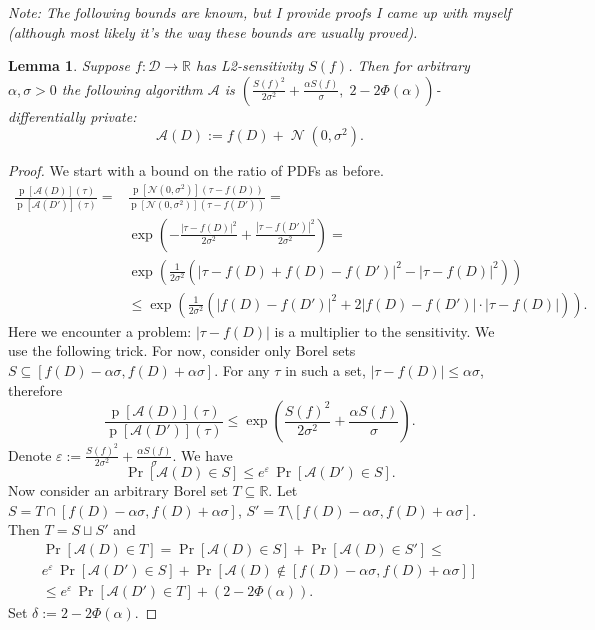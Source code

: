 \documentclass[12pt,letterpaper]{article}
\newcommand{\R}{\mathbb{R}}
\let\eps\varepsilon
\newcommand{\p}{\operatorname{p}}
\newtheorem{lemma}{Lemma}
\newcommand{\No}{\mathcal{N}}
\begin{document}
{\it Note: The following bounds are known, but I provide proofs I came up with myself (although most likely it's the way these bounds are usually proved).}
\begin{lemma}
  \label{lm:gaussian}
Suppose $f: \mathcal{D} \to \R$ has L2-sensitivity $S(f)$. Then for arbitrary $\alpha, \sigma > 0$ the following algorithm $\mathcal{A}$ is $\left(\tfrac{S(f)^2}{2\sigma^2} + \tfrac{\alpha S(f)}{\sigma},\; 2 - 2\Phi(\alpha)\right)$-differentially private:
$$\mathcal{A}(D) := f(D) + \operatorname{\No}(0, \sigma^2).$$
\end{lemma}
\begin{proof}
  We start with a bound on the ratio of PDFs as before.
  \begin{align*}
    \frac{\p[\mathcal{A}(D)](\tau)}{\p[\mathcal{A}(D')](\tau)} = &
    \frac{\p[\No(0, \sigma^2)](\tau - f(D))}{\p[\No(0,\sigma^2)](\tau - f(D'))} = \\
    &\exp\left(-\frac{|\tau - f(D)|^2}{2\sigma^2} + \frac{|\tau - f(D')|^2}{2\sigma^2}\right) = \\
    &\exp\left(\frac{1}{2\sigma^2}\left(|\tau - f(D) + f(D) - f(D')|^2 - |\tau - f(D)|^2\right)\right) \\
    &\leq \exp\left(\frac{1}{2\sigma^2}\left(|f(D) - f(D')|^2 + 2|f(D) - f(D')|\cdot|\tau - f(D)|\right)\right).
\end{align*}
Here we encounter a problem: $|\tau - f(D)|$ is a multiplier to the sensitivity. We use the following trick.
For now, consider only Borel sets $S \subseteq [f(D) - \alpha\sigma, f(D) + \alpha\sigma]$.
For any $\tau$ in such a set, $|\tau - f(D)| \leq \alpha\sigma$, therefore 
$$\frac{\p[\mathcal{A}(D)](\tau)}{\p[\mathcal{A}(D')](\tau)} \leq \exp\!\left(\frac{S(f)^2}{2\sigma^2} + \frac{\alpha S(f)}{\sigma}\right).$$
Denote $\eps := \tfrac{S(f)^2}{2\sigma^2} + \tfrac{\alpha S(f)}{\sigma}$. We have
$$\Pr[\mathcal{A}(D) \in S] \leq e^{\eps} \, \Pr[\mathcal{A}(D') \in S].$$
Now consider an arbitrary Borel set $T \subseteq \R$. Let $S = T \cap [f(D) -\alpha\sigma, f(D)+\alpha\sigma]$, $S' = T \setminus [f(D) - \alpha\sigma, f(D) + \alpha\sigma]$. Then $T = S \sqcup S'$ and
\begin{multline*}
\Pr[\mathcal{A}(D) \in T] = \Pr[\mathcal{A}(D) \in S] + \Pr[\mathcal{A}(D) \in S'] \leq\\
 e^{\eps} \, \Pr[\mathcal{A}(D') \in S] + \Pr\left[\mathcal{A}(D) \notin [f(D) -\alpha\sigma, f(D)+\alpha\sigma]\right] \\ \leq e^{\eps} \, \Pr[\mathcal{A}(D') \in T] + \left(2 - 2\Phi(\alpha)\right).
\end{multline*}
Set $\delta := 2 - 2\Phi(\alpha)$.
\end{proof}
\end{document}
